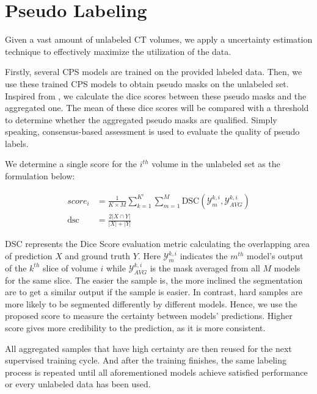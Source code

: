 \section{Pseudo Labeling}
\label{sec:labeling}


Given a vast amount of unlabeled CT volumes, we apply a uncertainty estimation technique to effectively maximize the utilization of the data.

Firstly, several CPS models are trained on the provided labeled data.
Then, we use these trained CPS models to obtain pseudo masks on the unlabeled set. Inspired from \cite{wang2019twostagequery}, we calculate the dice scores between these pseudo masks and the aggregated one. The mean of these dice scores will be compared with a threshold to determine whether the aggregated pseudo masks are qualified. Simply speaking, consensus-based assessment is used to evaluate the quality of pseudo labels.

We determine a single score for the $i^{th}$ volume in the unlabeled set as the formulation below:

\begin{align}
        score_{i} &= \frac{1}{K \times M} \sum_{k=1}^{K^{i}} \sum_{m=1}^{M} \text{DSC}(\mathcal{Y}^{k,i}_{m}, \mathcal{Y}^{k,i}_{AVG}) \\
        \text{dsc}  &= \frac{2 |X \cap Y|}{|X| + |Y|}
        \label{eqn:uncertainty}
\end{align}

DSC represents the Dice Score evaluation metric calculating the overlapping area of prediction $X$ and ground truth $Y$. 
Here $\mathcal{Y}^{k,i}_{m}$ indicates the $m^{th}$ model’s output of the $k^{th}$ slice of volume $i$ while $\mathcal{Y}^{k,i}_{AVG}$ is the mask averaged from all $M$ models for the same slice. The easier the sample is, the more inclined the segmentation are to get a similar output if the sample is easier. In contrast, hard samples are more likely to be segmented differently by different models. Hence, we use the proposed score to measure the certainty between models' predictions. Higher score gives more credibility to the prediction, as it is more consistent. 

All aggregated samples that have high certainty are then reused for the next supervised training cycle. And after the training finishes, the same labeling process is repeated until all aforementioned models achieve satisfied performance or every unlabeled data has been used.